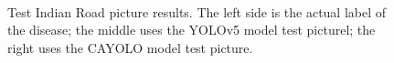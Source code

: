 \documentclass[sensors,article,submit,moreauthors]{Definitions/mdpi}
\begin{document}
\begin{figure}[H]
{\begin{minipage}{0.9\textwidth}
            \end{minipage}}\\

        \captionsetup[subfloat]{labelformat=parens}
        \caption{Test Indian Road picture results. The left side is the actual label of the disease; the middle uses the YOLOv5 model test picturel; the right uses the CAYOLO model test picture.\label{fig:13}}
    \end{figure}
\end{document}
